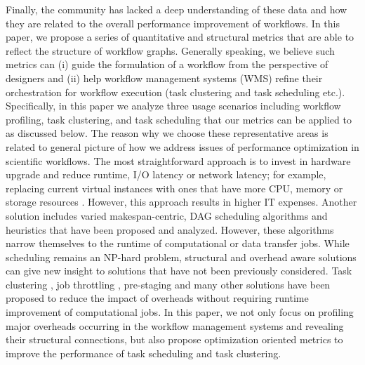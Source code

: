 Finally, the community has lacked a deep understanding of these data and how they are related to the overall performance improvement of workflows. In this paper, we propose a series of quantitative and structural metrics that are able to reflect the structure of workflow graphs. Generally speaking, we believe such metrics can (i) guide the formulation of a workflow from the perspective of designers and (ii) help workflow management systems (WMS) refine their orchestration for workflow execution (task clustering and task scheduling etc.). Specifically, in this paper we analyze three usage scenarios including workflow profiling, task clustering, and task scheduling that our metrics can be applied to as discussed below. The reason why we choose these representative areas is related to general picture of how we address issues of performance optimization in scientific workflows. 
The most straightforward approach is to invest in hardware upgrade and reduce runtime, I/O latency or network latency; for example, replacing current virtual instances with ones that have more CPU, memory or storage resources \cite{Berriman2010, Juve2012}. However, this approach results in higher IT expenses. Another solution includes varied makespan-centric, DAG scheduling algorithms and heuristics \cite{Cao2008, Dong2010, Braun2001} that have been proposed and analyzed. However, these algorithms narrow themselves to the runtime of computational or data transfer jobs. While scheduling remains an NP-hard problem, structural and overhead aware solutions can give new insight to solutions that have not been previously considered. Task clustering \cite{Chen-balanced-2013, Ferreira-granularity-2013}, job throttling \cite{Humphrey2008}, pre-staging \cite{Amer2012} and many other solutions have been proposed to reduce the impact of overheads without requiring runtime improvement of computational jobs. In this paper, we not only focus on profiling major overheads occurring in the workflow management systems and revealing their structural connections, but also propose optimization oriented metrics to improve the performance of task scheduling and task clustering. 

